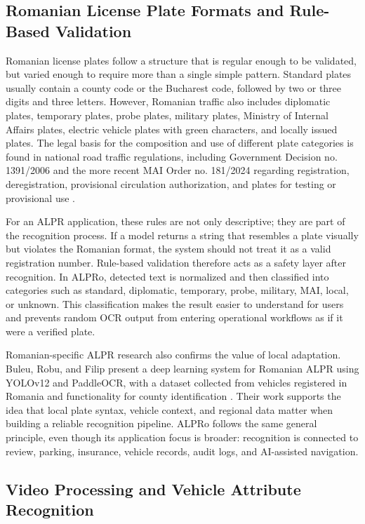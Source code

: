 ﻿\documentclass[12pt,a4paper]{article}
\begin{document}
\subsection{Romanian License Plate Formats and Rule-Based Validation}

Romanian license plates follow a structure that is regular enough to be validated, but varied enough to require more than a single simple pattern. Standard plates usually contain a county code or the Bucharest code, followed by two or three digits and three letters. However, Romanian traffic also includes diplomatic plates, temporary plates, probe plates, military plates, Ministry of Internal Affairs plates, electric vehicle plates with green characters, and locally issued plates. The legal basis for the composition and use of different plate categories is found in national road traffic regulations, including Government Decision no. 1391/2006 and the more recent MAI Order no. 181/2024 regarding registration, deregistration, provisional circulation authorization, and plates for testing or provisional use \cite{HG1391,Ordin181}.

For an ALPR application, these rules are not only descriptive; they are part of the recognition process. If a model returns a string that resembles a plate visually but violates the Romanian format, the system should not treat it as a valid registration number. Rule-based validation therefore acts as a safety layer after recognition. In ALPRo, detected text is normalized and then classified into categories such as standard, diplomatic, temporary, probe, military, MAI, local, or unknown. This classification makes the result easier to understand for users and prevents random OCR output from entering operational workflows as if it were a verified plate.

Romanian-specific ALPR research also confirms the value of local adaptation. Buleu, Robu, and Filip present a deep learning system for Romanian ALPR using YOLOv12 and PaddleOCR, with a dataset collected from vehicles registered in Romania and functionality for county identification \cite{Buleu2025}. Their work supports the idea that local plate syntax, vehicle context, and regional data matter when building a reliable recognition pipeline. ALPRo follows the same general principle, even though its application focus is broader: recognition is connected to review, parking, insurance, vehicle records, audit logs, and AI-assisted navigation.

\subsection{Video Processing and Vehicle Attribute Recognition}
\end{document}
